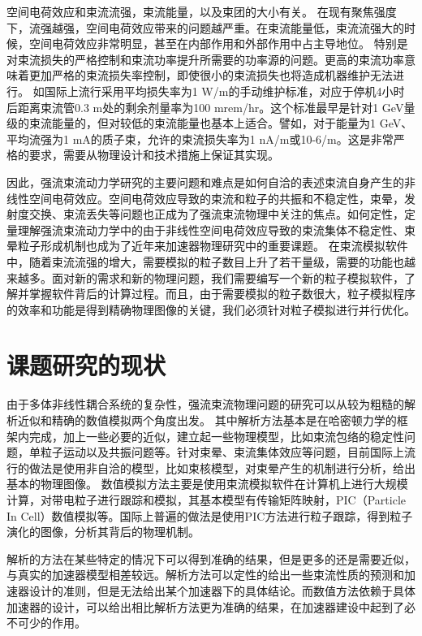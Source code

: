 空间电荷效应和束流流强，束流能量，以及束团的大小有关。
在现有聚焦强度下，流强越强，空间电荷效应带来的问题越严重。在束流能量低，束流流强大的时候，空间电荷效应非常明显，甚至在内部作用和外部作用中占主导地位。
特别是对束流损失的严格控制和束流功率提升所需要的功率源的问题。更高的束流功率意味着更加严格的束流损失率控制，即使很小的束流损失也将造成机器维护无法进行。
如国际上流行采用平均损失率为1 W/m的手动维护标准，对应于停机4小时后距离束流管0.3 m处的剩余剂量率为100 mrem/hr。这个标准最早是针对1 GeV量级的束流能量的，但对较低的束流能量也基本上适合。譬如，对于能量为1 GeV、平均流强为1 mA的质子束，允许的束流损失率为1 nA/m或10-6/m。这是非常严格的要求，需要从物理设计和技术措施上保证其实现。

因此，强流束流动力学研究的主要问题和难点是如何自洽的表述束流自身产生的非线性空间电荷效应。空间电荷效应导致的束流和粒子的共振和不稳定性，束晕，发射度交换、束流丢失等问题也正成为了强流束流物理中关注的焦点。如何定性，定量理解强流束流动力学中的由于非线性空间电荷效应导致的束流集体不稳定性、束晕粒子形成机制也成为了近年来加速器物理研究中的重要课题。
在束流模拟软件中，随着束流流强的增大，需要模拟的粒子数目上升了若干量级，需要的功能也越来越多。面对新的需求和新的物理问题，我们需要编写一个新的粒子模拟软件，了解并掌握软件背后的计算过程。而且，由于需要模拟的粒子数很大，粒子模拟程序的效率和功能是得到精确物理图像的关键，我们必须针对粒子模拟进行并行优化。

\section{课题研究的现状}
由于多体非线性耦合系统的复杂性，强流束流物理问题的研究可以从较为粗糙的解析近似和精确的数值模拟两个角度出发。
其中解析方法基本是在哈密顿力学的框架内完成，加上一些必要的近似，建立起一些物理模型，比如束流包络的稳定性问题，单粒子运动以及共振问题等。针对束晕、束流集体效应等问题，目前国际上流行的做法是使用非自洽的模型，比如束核模型，对束晕产生的机制进行分析，给出基本的物理图像。
数值模拟方法主要是使用束流模拟软件在计算机上进行大规模计算，对带电粒子进行跟踪和模拟，其基本模型有传输矩阵映射，PIC（Particle In Cell）数值模拟等。国际上普遍的做法是使用PIC方法进行粒子跟踪，得到粒子演化的图像，分析其背后的物理机制。

解析的方法在某些特定的情况下可以得到准确的结果，但是更多的还是需要近似，与真实的加速器模型相差较远。解析方法可以定性的给出一些束流性质的预测和加速器设计的准则，但是无法给出某个加速器下的具体结论。而数值方法依赖于具体加速器的设计，可以给出相比解析方法更为准确的结果，在加速器建设中起到了必不可少的作用。

